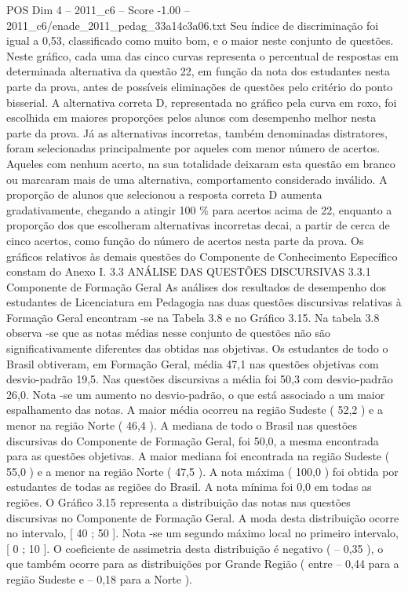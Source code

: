\begin{textsample}{POS Dim 4 – 2011\_c6 – Score -1.00 – 2011\_c6/enade\_2011\_pedag\_33a14c3a06.txt}
Seu índice de discriminação foi igual a 0,53, classificado como muito bom, e o maior neste conjunto de questões.
Neste gráfico, cada uma das cinco curvas representa o percentual de respostas em determinada alternativa da questão 22, em função da nota dos estudantes nesta parte da prova, antes de possíveis eliminações de questões pelo critério do ponto bisserial.
A alternativa correta D, representada no gráfico pela curva em roxo, foi escolhida em maiores proporções pelos alunos com desempenho melhor nesta parte da prova.
Já as alternativas incorretas, também denominadas distratores, foram selecionadas principalmente por aqueles com menor número de acertos.
Aqueles com nenhum acerto, na sua totalidade deixaram esta questão em branco ou marcaram mais de uma alternativa, comportamento considerado inválido.
A proporção de alunos que selecionou a resposta correta D aumenta gradativamente, chegando a atingir 100 \% para acertos acima de 22, enquanto a proporção dos que escolheram alternativas incorretas decai, a partir de cerca de cinco acertos, como função do número de acertos nesta parte da prova.
Os gráficos relativos às demais questões do Componente de Conhecimento Específico constam do Anexo I. 3.3 ANÁLISE DAS QUESTÕES DISCURSIVAS 3.3.1 Componente de Formação Geral As análises dos resultados de desempenho dos estudantes de Licenciatura em Pedagogia nas duas questões discursivas relativas à Formação Geral encontram -se na Tabela 3.8 e no Gráfico 3.15.
Na tabela 3.8 observa -se que as notas médias nesse conjunto de questões não são significativamente diferentes das obtidas nas objetivas.
Os estudantes de todo o Brasil obtiveram, em Formação Geral, média 47,1 nas questões objetivas com desvio-padrão 19,5.
Nas questões discursivas a média foi 50,3 com desvio-padrão 26,0.
Nota -se um aumento no desvio-padrão, o que está associado a um maior espalhamento das notas.
A maior média ocorreu na região Sudeste ( 52,2 ) e a menor na região Norte ( 46,4 ).
A mediana de todo o Brasil nas questões discursivas do Componente de Formação Geral, foi 50,0, a mesma encontrada para as questões objetivas.
A maior mediana foi encontrada na região Sudeste ( 55,0 ) e a menor na região Norte ( 47,5 ).
A nota máxima ( 100,0 ) foi obtida por estudantes de todas as regiões do Brasil.
A nota mínima foi 0,0 em todas as regiões.
O Gráfico 3.15 representa a distribuição das notas nas questões discursivas no Componente de Formação Geral.
A moda desta distribuição ocorre no intervalo, [ 40 ; 50 ].
Nota -se um segundo máximo local no primeiro intervalo, [ 0 ; 10 ].
O coeficiente de assimetria desta distribuição é negativo ( – 0,35 ), o que também ocorre para as distribuições por Grande Região ( entre – 0,44 para a região Sudeste e – 0,18 para a Norte ).

\end{textsample}
